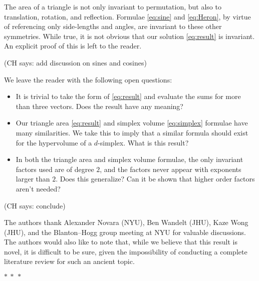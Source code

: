 \documentclass[12pt]{article}
\newcommand{\CH}[1]{{\color{blue} (CH says: #1)}}
\newcommand{\pseudosection}[1]
{}
\begin{document}
\pseudosection{Discussion: other symmetries}

The area of a triangle is not only invariant to permutation, but also to translation, rotation, and reflection.
Formulae \eqref{eq:sine} and \eqref{eq:Heron}, by virtue of referencing only side-lengths and angles, are invariant to these other symmetries.
While true, it is not obvious that our solution \eqref{eq:result} is invariant. An explicit proof of this is left to the reader.

\pseudosection{Discussion: sines and cosines}

\CH{add discussion on sines and cosines}

\pseudosection{Discussion: open questions}


We leave the reader with the following open questions:
\begin{itemize}
    \item It is trivial to take the form of \eqref{eq:result} and evaluate the sums for more than three vectors. Does the result have any meaning?

    \item Our triangle area \eqref{eq:result} and simplex volume \eqref{eq:simplex} formulae have many similarities. We take this to imply that a similar formula should exist for the hypervolume of a $d$-simplex. What is this result?

    \item In both the triangle area and simplex volume formulae, the only invariant factors used are of degree $2$, and the factors never appear with exponents larger than $2$. Does this generalize? Can it be shown that higher order factors aren't needed?
\end{itemize}

\CH{conclude}

The authors thank Alexander Novara (NYU), Ben Wandelt (JHU), Kaze Wong (JHU), and the Blanton--Hogg group meeting at NYU for valuable discussions. The authors would also like to note that, while we believe that this result is novel, it is difficult to be sure, given the impossibility of conducting a complete literature review for such an ancient topic.

\bigskip
{\centering $\ast~\ast~\ast$ \par}

\renewcommand{\section}[2]{}%
{\small\singlespacing}
\end{document}
